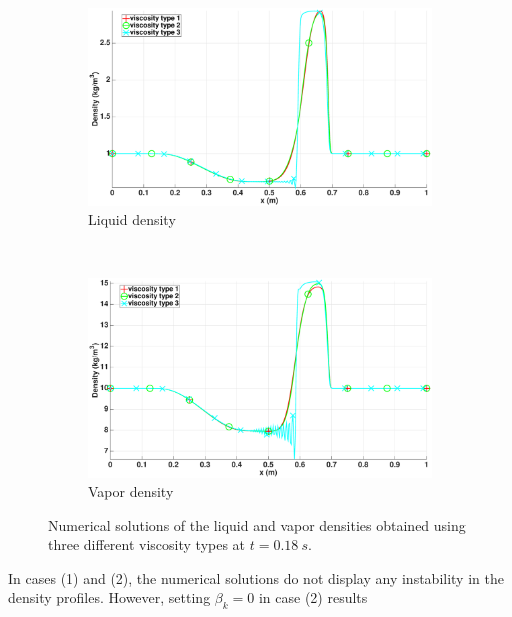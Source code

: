 \begin{figure}[H]
        \centering
        \begin{subfigure}[b]{0.95\textwidth}
                \centering
                \includegraphics[width=\textwidth]{figures/relaxation_vapor_density_multiple_visc.eps}
                \caption{Liquid density}
                \label{fig:liq-density}
        \end{subfigure}
				\\
        \begin{subfigure}[b]{0.95\textwidth}
                \centering
                \includegraphics[width=\textwidth]{figures/relaxation_liquid_density_multiple_visc.eps}
                \caption{Vapor density}
                \label{fig:vap-density}
        \end{subfigure}
        \caption{Numerical solutions of the liquid and vapor densities obtained using three different viscosity types at $t=0.18 \ s$.}\label{fig:density}
\end{figure}
%
In cases (1) and (2), the numerical solutions do not display any instability in the density profiles. However, setting $\beta_k=0$ in case (2) results 
